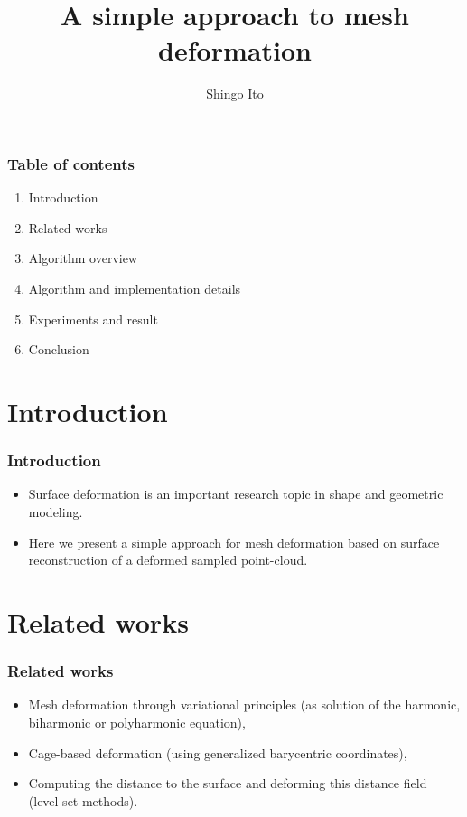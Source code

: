\documentclass{beamer}
\begin{document}
\title{A simple approach to mesh deformation}
\author{Shingo Ito}
\date{}

\frame{\titlepage}


\begin{frame}
\frametitle{Table of contents} 
\Large
\begin{enumerate}
\item Introduction
\item Related works
\item Algorithm overview
\item Algorithm and implementation details
\item Experiments and result
\item Conclusion

\end{enumerate}
\end{frame}


\section{Introduction}


\begin{frame}
	\frametitle{Introduction}
	\Large
	\begin{itemize}
	\item Surface deformation is an important research topic in shape and geometric modeling.
   	\item Here we present a simple approach for mesh deformation based on surface reconstruction of a deformed sampled point-cloud.
	\end{itemize}
\end{frame}

\section{Related works}
\begin{frame}
\frametitle{Related works}
\Large
\begin{itemize}
\item Mesh deformation through variational principles (as solution of the harmonic, biharmonic or polyharmonic equation),
\item Cage-based deformation (using generalized barycentric coordinates),
\item Computing the distance to the surface and deforming this distance field (level-set methods).
\end{itemize}
\end{frame}
\end{document}
